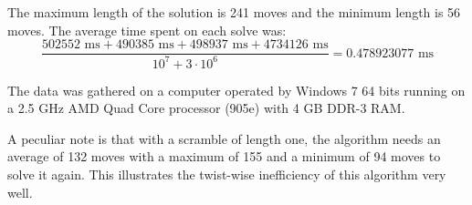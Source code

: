 The maximum length of the solution is 241 moves and the minimum length is 56 moves.
The average time spent on each solve was:
\[
\frac{502552 \text{ ms} + 490385 \text{ ms} + 498937 \text{ ms} + 4734126 \text{ ms}}{10^{7} + 3 \cdot 10^{6}} = 0.478923077 \text{ ms}
\]

The data was gathered on a computer operated by Windows 7 64 bits running on a 2.5 GHz AMD Quad Core processor (905e) with 4 GB DDR-3 RAM.

A peculiar note is that with a scramble of length one, the algorithm needs an average of 132 moves with a maximum of 155 and a minimum of 94 moves to solve it again.
This illustrates the twist-wise inefficiency of this algorithm very well.